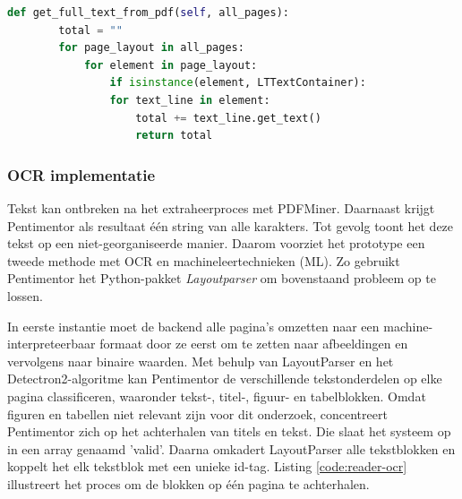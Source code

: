 \begin{lstlisting}[language=Python, caption={Een PDF inlezen met PDFMiner}, label={code:inlezen-van-pdf}]
	def get_full_text_from_pdf(self, all_pages):
		total = ""
		for page_layout in all_pages:
			for element in page_layout:
				if isinstance(element, LTTextContainer):
				for text_line in element:
					total += text_line.get_text()
					return total
\end{lstlisting}

\subsubsection{OCR implementatie}

Tekst kan ontbreken na het extraheerproces met PDFMiner. Daarnaast krijgt Pentimentor als resultaat één string van alle karakters. Tot gevolg toont het deze tekst op een niet-georganiseerde manier. Daarom voorziet het prototype een tweede methode met OCR en machineleertechnieken (ML). Zo gebruikt Pentimentor het Python-pakket \textit{Layoutparser} om bovenstaand probleem op te lossen.

\medspace

In eerste instantie moet de backend alle pagina's omzetten naar een machine-interpreteerbaar formaat door ze eerst om te zetten naar afbeeldingen en vervolgens naar binaire waarden. Met behulp van LayoutParser en het Detectron2-algoritme kan Pentimentor de verschillende tekstonderdelen op elke pagina classificeren, waaronder tekst-, titel-, figuur- en tabelblokken. Omdat figuren en tabellen niet relevant zijn voor dit onderzoek, concentreert Pentimentor zich op het achterhalen van titels en tekst. Die slaat het systeem op in een array genaamd 'valid'. Daarna omkadert LayoutParser alle tekstblokken en koppelt het elk tekstblok met een unieke id-tag. Listing \ref{code:reader-ocr} illustreert het proces om de blokken op één pagina te achterhalen.

